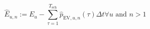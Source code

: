 \begin{equation}
	\hat{E}_{u,n} := E_u - \sum_{\tau=1}^{T_\text{sch}} \hat{p}_{\text{EV},u,n}(\tau)\Delta t \forall u \text{ and } n > 1
	\label{ch3:equ:temporary-charging-demand}
\end{equation}
